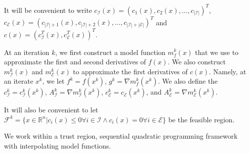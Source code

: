 \documentclass{article}
\begin{document}


It will be convenient to write
$c_{\mathcal {I}}(x) = (c_1(x), c_2(x), \ldots, c_{|\mathcal{I}|})^T$,
$c_{\mathcal {E}}(x) = (c_{|\mathcal{I}|+1}(x), c_{|\mathcal{I}|+2}(x), \ldots, c_{|\mathcal{I}| + |\mathcal{E}|})^T$ and
$c(x) = (c_{\mathcal{I}}^T(x), c_{\mathcal{E}}^T(x))^T$.


At an iteration $k$, we first construct a model function $m_f^k(x)$ that we use to approximate the first and second derivatives of $f(x)$.
We also construct $m_{\mathcal{I}}^k(x)$ and $m_{\mathcal{E}}^k(x)$ to approximate the first derivatives of $c(x)$.
Namely, at an iterate $x^k$, we let $f^k = f(x^k)$, $g^k = \nabla m_f^k(x^k)$. %
We also define the $c_{{\mathcal{I}}}^k = c^k_{\mathcal{I}}(x^k)$, 
$A_{{\mathcal{I}}}^k = \nabla m_{\mathcal{I}}^k(x^k)$,
$c_{{\mathcal{E}}}^k = c_{\mathcal{E}}(x^k)$, and
$A_{{\mathcal{E}}}^k = \nabla m_{\mathcal{E}}^k(x^k)$.

It will also be convenient to let $\mathcal{F}^k = \{ x \in \mathbb R^n | c_i(x) \le 0 \forall i \in \mathcal{I} \wedge c_i(x) = 0 \forall i \in \mathcal{E}\}$ be the feasible region.

We work within a trust region, sequential quadratic programming framework with interpolating model functions.

\end{document}
